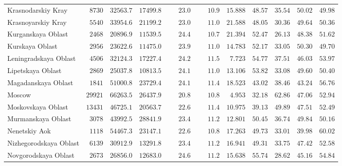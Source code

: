 \documentclass[alpha-refs]{wiley-article-03v}
\begin{document}
{\begin{longtable}{lcccccccccc}
		Krasnodarskiy Kray  & $\phantom{0}8730$ & $32563.7$ & $17499.8$ & $\phantom{000}23.0$ & $\phantom{000}10.9$ & $15.888$ & $48.57$ & $35.54$ & $50.02$ & $49.98$ \\
		Krasnoyarskiy Kray  & $\phantom{0}5540$ & $33954.6$ & $21199.2$ & $\phantom{000}23.0$ & $\phantom{000}11.0$ & $21.588$ & $48.05$ & $30.36$ & $49.64$ & $50.36$ \\
		Kurganskaya Oblast  & $\phantom{0}2468$ & $20896.9$ & $11539.5$ & $\phantom{000}24.4$ & $\phantom{000}10.7$ & $21.394$ & $52.47$ & $26.13$ & $48.38$ & $51.62$ \\
		Kurskaya Oblast  & $\phantom{0}2956$ & $23622.6$ & $11475.0$ & $\phantom{000}23.9$ & $\phantom{000}11.0$ & $14.783$ & $52.17$ & $33.05$ & $50.30$ & $49.70$ \\
		Leningradskaya Oblast  & $\phantom{0}4506$ & $32124.3$ & $17227.4$ & $\phantom{000}24.2$ & $\phantom{000}11.5$ & $\phantom{0}7.723$ & $54.77$ & $37.51$ & $46.03$ & $53.97$ \\
		Lipetskaya Oblast  & $\phantom{0}2869$ & $25037.8$ & $10813.5$ & $\phantom{000}24.1$ & $\phantom{000}11.0$ & $13.106$ & $53.82$ & $33.08$ & $49.60$ & $50.40$ \\
		Magadanskaya Oblast  & $\phantom{0}1841$ & $51000.8$ & $23729.4$ & $\phantom{000}24.1$ & $\phantom{000}11.4$ & $18.523$ & $43.02$ & $38.46$ & $43.24$ & $56.76$ \\
		Moscow  & $29921$ & $66263.5$ & $26437.9$ & $\phantom{000}20.8$ & $\phantom{000}10.8$ & $\phantom{0}4.953$ & $32.18$ & $62.86$ & $47.06$ & $52.94$ \\
		Moskovskaya Oblast  & $13431$ & $46725.1$ & $20563.7$ & $\phantom{000}22.6$ & $\phantom{000}11.4$ & $10.975$ & $39.13$ & $49.89$ & $47.51$ & $52.49$ \\
		Murmanskaya Oblast  & $\phantom{0}3078$ & $43992.5$ & $28841.9$ & $\phantom{000}23.4$ & $\phantom{000}11.2$ & $12.801$ & $50.45$ & $36.74$ & $49.84$ & $50.16$ \\
		Nenetskiy Aok  & $\phantom{0}1118$ & $54467.3$ & $23147.1$ & $\phantom{000}22.6$ & $\phantom{000}10.8$ & $17.263$ & $49.73$ & $33.01$ & $39.98$ & $60.02$ \\
		Nizhegorodskaya Oblast  & $\phantom{0}6139$ & $30912.9$ & $13291.8$ & $\phantom{000}23.4$ & $\phantom{000}11.2$ & $16.941$ & $49.31$ & $33.75$ & $47.42$ & $52.58$ \\
		Novgorodskaya Oblast  & $\phantom{0}2673$ & $26856.0$ & $12683.0$ & $\phantom{000}24.6$ & $\phantom{000}11.2$ & $15.638$ & $55.74$ & $28.62$ & $45.16$ & $54.84$ \\

\end{longtable}}
\end{document}
